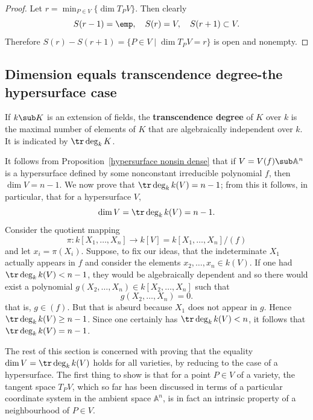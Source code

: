 \begin{proof}
Let $r=\min_{P\in V}\{\dim T_PV\}$. Then clearly
\[S(r-1)=\emp,\quad S(r)=V,\quad S(r+1)\subset V.\]
Therefore $S(r)-S(r+1)=\{P\in V\mid \dim T_PV=r\}$ is open and nonempty.
\end{proof}
\subsection{Dimension equals transcendence degree-the hypersurface case}
\begin{definition}
If $k\sub K$ is an extension of fields, the \textbf{transcendence degree} of $K$ over $k$ is the maximal number of elements of $K$ that are algebraically independent over $k$. It is indicated by $\tr\deg_kK$.
\end{definition}
It follows from Proposition~\ref{hypersurface nonsin dense} that if $V=V(f)\sub\mathbb{A}^n$ is a hypersurface defined by some nonconstant irreducible polynomial $f$, then $\dim V=n-1$. We now prove that $\tr\deg_kk(V)=n-1$; from this it follows, in particular, that for a hypersurface $V$,
\[\dim V=\tr\deg_kk(V)=n-1.\]
Consider the quotient mapping
\[\pi:k[X_1,\dots,X_n]\to k[V]=k[X_1,\dots,X_n]/(f)\]
and let $x_i=\pi(X_i)$. Suppose, to fix our ideas, that the indeterminate
$X_1$ actually appears in $f$ and consider the elements $x_2,\dots,x_n\in k(V)$. If one had $\tr\deg_kk(V)<n-1$, they would be algebraically dependent and so there would exist a polynomial $g(X_2,\dots,X_n)\in k[X_2,\dots,X_n]$ such that
\[g(X_2,\dots,X_n)=0.\]
that is, $g\in(f)$. But that is absurd because $X_1$ does not appear in $g$. Hence $\tr\deg_kk(V)\geq n-1$. Since one certainly has $\tr\deg_kk(V)<n$, it follows that $\tr\deg_kk(V)=n-1$.\par
The rest of this section is concerned with proving that the equality $\dim V=\tr\deg_kk(V)$ holds for all varieties, by reducing to the case of a hypersurface. The first thing to show is that for a point $P\in V$ of a variety, the tangent space $T_PV$, which so far has been discussed in terms of a particular coordinate system in the ambient space $\mathbb{A}^n$, is in fact an intrinsic property of a neighbourhood of $P\in V$.
